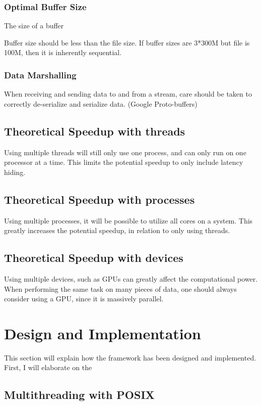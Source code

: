 \documentclass[a4paper]{article}
\begin{document}
\subsubsection{Optimal Buffer Size}
The size of a buffer

Buffer size should be less than the file size. If buffer sizes are 3*300M but file is 100M,
then it is inherently sequential.



\subsubsection{Data Marshalling}
When receiving and sending data to and from a stream, care should be taken to correctly de-serialize and serialize data.
(Google Proto-buffers)



\subsection{Theoretical Speedup with threads}
Using multiple threads will still only use one process, and can only run on one processor at a time. This limits
the potential speedup to only include latency hiding.



\subsection{Theoretical Speedup with processes}
Using multiple processes, it will be possible to utilize all cores on a system. This greatly increases the potential speedup,
in relation to only using threads.


\subsection{Theoretical Speedup with devices}
Using multiple devices, such as GPUs can greatly affect the computational power. When performing the same task on many pieces
of data, one should always consider using a GPU, since it is massively parallel.




\section{Design and Implementation}
This section will explain how the framework has been designed and implemented. First, I will elaborate on
the

\subsection{Multithreading with POSIX}
\end{document}
